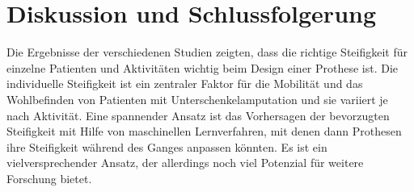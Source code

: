 \section{Diskussion und Schlussfolgerung}
Die Ergebnisse der verschiedenen Studien zeigten, dass die richtige Steifigkeit für einzelne Patienten und Aktivitäten wichtig beim Design einer Prothese ist. Die individuelle Steifigkeit ist ein zentraler Faktor für die Mobilität und das Wohlbefinden von Patienten mit Unterschenkelamputation und sie variiert je nach Aktivität. Eine spannender Ansatz ist das Vorhersagen der bevorzugten Steifigkeit mit Hilfe von maschinellen Lernverfahren, mit denen dann Prothesen ihre Steifigkeit während des Ganges anpassen könnten. Es ist ein vielversprechender Ansatz, der allerdings noch viel Potenzial für weitere Forschung bietet. 


